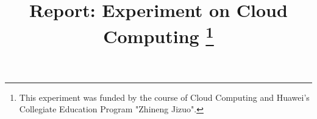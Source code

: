 \documentclass[conference]{IEEEtran}
\begin{document}
\title{Report: Experiment on Cloud Computing \thanks{This experiment was funded by the course of Cloud Computing and Huawei's Collegiate Education Program "Zhineng Jizuo".}}

\author{
}

\maketitle













\vfill




\end{document}
